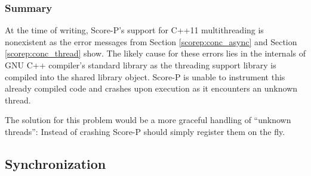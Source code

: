 \subsubsection{Summary}

At the time of writing, Score-P's support for C++11 multithreading is nonexistent as the error messages from Section \ref{scorep:conc_async} and Section \ref{scorep:conc_thread} show. The likely cause for these errors lies in the internals of GNU C++ compiler's standard library as the threading support library is compiled into the shared library object. Score-P is unable to instrument this already compiled code and crashes upon execution as it encounters an unknown thread.

The solution for this problem would be a more graceful handling of ``unknown threads'': Instead of crashing Score-P should simply register them on the fly.

\subsection{Synchronization}